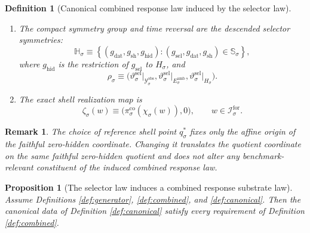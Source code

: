 \documentclass[11pt]{article}
\newcommand{\ForSpace}[1]{\mathcal I_{#1}^{\mathrm{for}}}
\newcommand{\DataSpace}[1]{\mathcal Y_{#1}^{\mathrm{obs}}}
\newcommand{\AmbientTarget}[1]{E_{#1}^{\mathrm{amb}}}
\newcommand{\ResponseHidden}[1]{\Xi_{#1}^{\mathrm{hid}}}
\newcommand{\GapSpace}[1]{H_{#1}}
\newcommand{\ResponseSym}[1]{\mathbb H_{#1}}
\newcommand{\ResponseTime}[1]{\rho_{#1}}
\newcommand{\ProtoEmbed}[1]{\zeta_{#1}}
\newcommand{\GenShell}[1]{\Lambda_{#1}^{\mathrm{sel,sh}}}
\newcommand{\GenSym}[1]{\mathbb S_{#1}}
\newcommand{\GenTime}[1]{\vartheta_{#1}^{\mathrm{sel}}}
\newcommand{\GenEmbed}[1]{\chi_{#1}}
\newcommand{\ReferencePoint}[1]{q_{#1}^{\ast}}
\newcommand{\CoreCoord}[1]{\pi_{#1}^{\mathrm{co}}}
\newtheorem{definition}{Definition}
\newtheorem{proposition}{Proposition}
\newtheorem{remark}{Remark}
\begin{document}
\begin{definition}[Canonical combined response law induced by the selector law]
\begin{enumerate}
\[    \equiv
    \GenShell{\sigma}(\ReferencePoint{\sigma}+m),
    \qquad
    \ResponseHidden{\sigma}(m,\eta)
    \equiv
    \eta.
    \]
    \item The compact symmetry group and time reversal are the descended selector symmetries:
    \[
    \ResponseSym{\sigma}
    \equiv
    \left\{
    (g_{\mathrm{dat}},g_{\mathrm{sh}},g_{\mathrm{hid}}):
    (g_{\mathrm{sel}},g_{\mathrm{dat}},g_{\mathrm{sh}})
    \in\GenSym{\sigma}
    \right\},
    \]
    where \(g_{\mathrm{hid}}\) is the restriction of \(g_{\mathrm{sel}}\) to \(\GapSpace{\sigma}\), and
    \[
    \ResponseTime{\sigma}
    \equiv
    \bigl(
    \GenTime{\sigma}\big|_{\DataSpace{\sigma}},
    \GenTime{\sigma}\big|_{\AmbientTarget{\sigma}},
    \GenTime{\sigma}\big|_{\GapSpace{\sigma}}
    \bigr).
    \]
    \item The exact shell realization map is
    \begin{equation}
    \ProtoEmbed{\sigma}(w)
    \equiv
    \bigl(
    \CoreCoord{\sigma}(\GenEmbed{\sigma}(w)),
    0
    \bigr),
    \qquad
    w\in\ForSpace{\sigma}.
    \label{eq:protoembed}
    \end{equation}
\end{enumerate}
\end{definition}

\begin{remark}
The choice of reference shell point \(\ReferencePoint{\sigma}\) fixes only the affine origin of the faithful zero-hidden coordinate. Changing it translates the quotient coordinate on the same faithful zero-hidden quotient and does not alter any benchmark-relevant constituent of the induced combined response law.
\end{remark}

\begin{proposition}[The selector law induces a combined response substrate law]
\label{prop:combined}
Assume Definitions \ref{def:generator}, \ref{def:combined}, and \ref{def:canonical}. Then the canonical data of Definition \ref{def:canonical} satisfy every requirement of Definition \ref{def:combined}.
\end{proposition}
\end{document}
